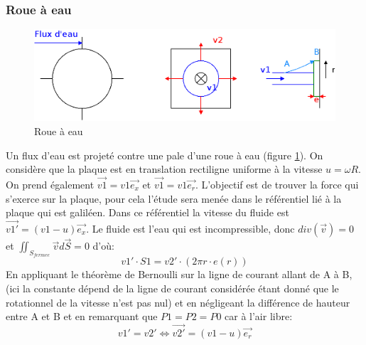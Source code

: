 \documentclass[10pt,a4paper]{article}
\begin{document}
\subsubsection{Roue à eau}
\begin{figure}
\centering
\includegraphics[scale=0.30]{roue}
\caption{Roue à eau}
\label{fig:roue}
\end{figure}
Un flux d'eau est projeté contre une pale d'une roue à eau (figure \ref{fig:roue}). On considère que la plaque est en translation rectiligne uniforme à la vitesse $u=\omega R$. On prend également $\vec{v1} = v1 \vec{e_{x}}$ et $\vec{v1} = v1 \vec{e_{r}}$. L'objectif est de trouver la force qui s'exerce sur la plaque, pour cela l'étude sera menée dans le référentiel lié à la plaque qui est galiléen. Dans ce référentiel la vitesse du fluide est $\vec{v1'} = (v1-u) \vec{e_{x}}$. Le fluide est l'eau qui est incompressible, donc $div(\vec{v}) = 0$ et $\iint_{S_{fermee}}\vec{v}d\vec{S} = 0$ d'où:
\[ v1'\cdot S1 = v2'\cdot (2\pi r \cdot e(r))\]
En appliquant le théorème de Bernoulli sur la ligne de courant allant de A à B, (ici la constante dépend de la ligne de courant considérée étant donné que le rotationnel de la vitesse n'est pas nul) et en négligeant la différence de hauteur entre A et B et en remarquant que $P1 = P2 = P0$ car à l'air libre:
\[v1' = v2' \iff \vec{v2'} = (v1 - u)\vec{e_{r}}\]
\end{document}
